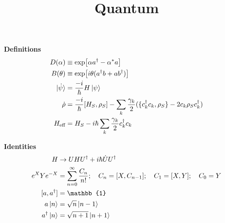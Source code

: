 \documentclass[12pt]{article}
\title{Quantum}
\date{}
\begin{document}
\maketitle

\textbf{Definitions}
\begin{align}
  D(\alpha) &\equiv \exp[\alpha a^{\dagger} - \alpha^{*} a]\\
  B(\theta) &\equiv \exp[i\theta(a^{\dagger}b + ab^{\dagger})]\\
  \ket*{\dot{\psi}} &= \frac{-i}{\hbar} H \ket{\psi}\\
  \dot{\rho} &= \frac{-i}{\hbar} [H_S, \rho_S] - \sum_k \frac{\gamma_k}{2}(\{c_k^{\dagger} c_k, \rho_S\} - 2 c_k \rho_S c_k^{\dagger})\\
  H_{\textrm{eff}} &= H_{S} - i \hbar \sum_k \frac{\gamma_k}{2} c_k^{\dagger} c_k
\end{align}

\textbf{Identities}
\begin{align}
  H &\rightarrow UHU^{\dagger} + i \hbar\dot{U}U^{\dagger}\\
  e^{X} Y e^{-X} &= \sum_{n = 0}^{\infty} \frac{C_n}{n!}; \quad C_n = [X, C_{n - 1}]; \quad C_1 = [X, Y]; \quad C_0 = Y\\
  [a, a^{\dagger}] &= \mathbb{1}\\
  a \ket{n} &= \sqrt{n} \ket{n - 1}\\
  a^{\dagger} \ket{n} &= \sqrt{n + 1}\ket{n + 1}
\end{align}
\end{document}
